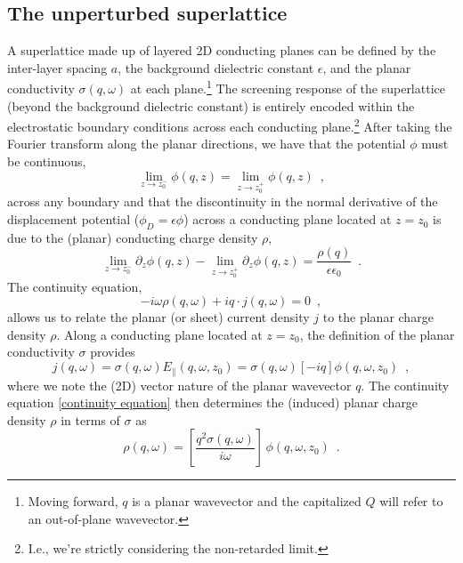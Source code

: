 \documentclass[submission, Phys]{SciPost}
\newcommand{\lb}{\left[}
\newcommand{\rb}{\right]}
\newcommand{\e}{\epsilon}
\begin{document}
\subsection{The unperturbed superlattice}

A superlattice made up of layered 2D conducting planes can be defined by the inter-layer spacing $a$, the background dielectric constant $\e$, and the planar conductivity $\sigma(q,\omega)$ at each plane.\footnote{Moving forward, $q$ is a planar wavevector and the capitalized $Q$ will refer to an out-of-plane wavevector.}  The screening response of the superlattice (beyond the background dielectric constant) is entirely encoded within the electrostatic boundary conditions across each conducting plane.\footnote{I.e., we're strictly considering the non-retarded limit.}  After taking the Fourier transform along the planar directions, we have that the potential $\phi$ must be continuous,
\begin{equation}
    \label{phi continuity}
    \lim_{z\to z_0^-}\phi(q,z) = \lim_{z\to z_0^+}\phi(q,z)
    \,\,\,,
\end{equation}
across any boundary and that the discontinuity in the normal derivative of the displacement potential ($\phi_D = \e\phi$) across a conducting plane located at $z=z_0$ is due to the (planar) conducting charge density $\rho$,
\begin{equation}
    \label{phi discontinuity expression}
    \lim_{z\to z_0^-}\partial_z\phi(q,z) - \lim_{z\to z_0^+}\partial_z\phi(q,z) = \frac{\rho(q)}{\e\e_0}
    \,\,\,.
\end{equation}
The continuity equation,
\begin{equation}
\label{continuity equation}
    -i\omega\rho(q,\omega) +iq\cdot j(q,\omega) = 0
    \,\,\,,
\end{equation}
allows us to relate the planar (or sheet) current density $j$ to the planar charge density $\rho$.  Along a conducting plane located at $z=z_0$, the definition of the planar conductivity $\sigma$ provides
\begin{equation}
    \label{conductivity def}
    j(q,\omega) = \sigma(q,\omega) E_\parallel(q,\omega,z_0) = \sigma(q,\omega) \lb -i q\rb\phi(q,\omega,z_0)
    \,\,\,,
\end{equation}
where we note the (2D) vector nature of the planar wavevector $q$.  The continuity equation \eqref{continuity equation} then determines the (induced) planar charge density $\rho$ in terms of $\sigma$ as
\begin{equation}
\label{charge density conductivity relation}
\rho(q,\omega) =
\lb\frac{q^2\sigma(q,\omega)}{i\omega}\rb\,\phi(q,\omega,z_0)
\,\,\,.
\end{equation}
\end{document}
